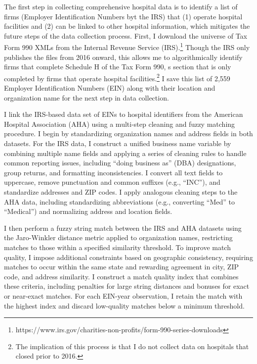 \documentclass[12pt]{article}
\begin{document}
    The first step in collecting comprehensive hospital data is to identify a list of firms (Employer Identification Numbers byt the IRS) that (1) operate hospital facilities and (2) can be linked to other hospital information, which mitigates the future steps of the data collection process. First, I download the universe of Tax Form 990 XMLs from the Internal Revenue Service (IRS).\footnote{https://www.irs.gov/charities-non-profits/form-990-series-downloads} Though the IRS only publishes the files from 2016 onward, this allows me to algorithmically identify firms that complete Schedule H of the Tax Form 990, s section that is only completed by firms that operate hospital facilities.\footnote{The implication of this process is that I do not collect data on hospitals that closed prior to 2016.} I save this list of 2,559 Employer Identification Numbers (EIN) along with their location and organization name for the next step in data collection.

    I link the IRS-based data set of EINs to hospital identifiers from the American Hospital Association (AHA) using a multi-step cleaning and fuzzy matching procedure. I begin by standardizing organization names and address fields in both datasets. For the IRS data, I construct a unified business name variable by combining multiple name fields and applying a series of cleaning rules to handle common reporting issues, including ``doing business as'' (DBA) designations, group returns, and formatting inconsistencies. I convert all text fields to uppercase, remove punctuation and common suffixes (e.g., ``INC''), and standardize addresses and ZIP codes. I apply analogous cleaning steps to the AHA data, including standardizing abbreviations (e.g., converting ``Med'' to ``Medical'') and normalizing address and location fields.

    I then perform a fuzzy string match between the IRS and AHA datasets using the Jaro-Winkler distance metric applied to organization names, restricting matches to those within a specified similarity threshold. To improve match quality, I impose additional constraints based on geographic consistency, requiring matches to occur within the same state and rewarding agreement in city, ZIP code, and address similarity. I construct a match quality index that combines these criteria, including penalties for large string distances and bonuses for exact or near-exact matches. For each EIN-year observation, I retain the match with the highest index and discard low-quality matches below a minimum threshold.
\end{document}
